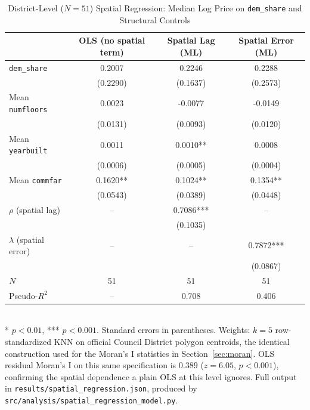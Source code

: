 \begin{table}[H]
\centering
\caption{District-Level ($N=51$) Spatial Regression: Median Log Price on \texttt{dem\_share} and Structural Controls}\label{tab:spatial}
\begin{tabular}{lccc}
\toprule
 & OLS (no spatial term) & Spatial Lag (ML) & Spatial Error (ML) \\
\midrule
\texttt{dem\_share} & 0.2007 & 0.2246 & 0.2288 \\
 & (0.2290) & (0.1637) & (0.2573) \\
Mean \texttt{numfloors} & 0.0023 & -0.0077 & -0.0149 \\
 & (0.0131) & (0.0093) & (0.0120) \\
Mean \texttt{yearbuilt} & 0.0011 & 0.0010** & 0.0008 \\
 & (0.0006) & (0.0005) & (0.0004) \\
Mean \texttt{commfar} & 0.1620** & 0.1024** & 0.1354** \\
 & (0.0543) & (0.0389) & (0.0448) \\
\midrule
$\rho$ (spatial lag) & -- & 0.7086*** & -- \\
 & & (0.1035) & \\
$\lambda$ (spatial error) & -- & -- & 0.7872*** \\
 & & & (0.0867) \\
\midrule
$N$ & 51 & 51 & 51 \\
Pseudo-$R^2$ & -- & 0.708 & 0.406 \\
\bottomrule
\end{tabular}
\\[4pt]
\footnotesize ** $p<0.01$, *** $p<0.001$. Standard errors in parentheses. Weights: $k=5$ row-standardized KNN on official Council District polygon centroids, the identical construction used for the Moran's I statistics in Section~\ref{sec:moran}. OLS residual Moran's I on this same specification is $0.389$ ($z=6.05$, $p<0.001$), confirming the spatial dependence a plain OLS at this level ignores. Full output in \texttt{results/spatial\_regression.json}, produced by \texttt{src/analysis/spatial\_regression\_model.py}.
\end{table}
